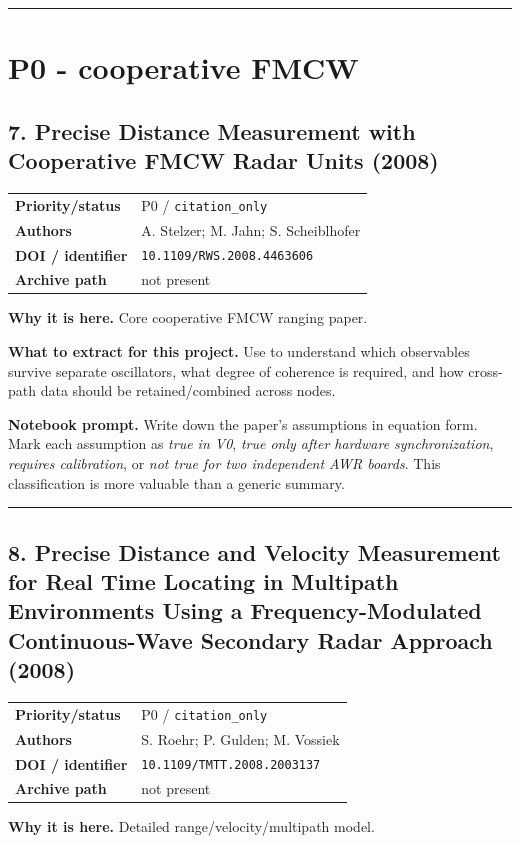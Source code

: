 \documentclass[10.5pt]{article}
\begin{document}
\vspace{0.35em}\hrule\vspace{0.65em}

\clearpage
\section{P0 - cooperative FMCW}

\subsection*{7. Precise Distance Measurement with Cooperative FMCW Radar Units (2008)}
\begin{tabularx}{\textwidth}{@{}p{}X@{}}
\textbf{Priority/status} & P0 / \nolinkurl{citation_only} \\
\textbf{Authors} & A. Stelzer; M. Jahn; S. Scheiblhofer \\
\textbf{DOI / identifier} & \nolinkurl{10.1109/RWS.2008.4463606} \\
\textbf{Archive path} & not present \\
\end{tabularx}
\textbf{Why it is here.} Core cooperative FMCW ranging paper.

\textbf{What to extract for this project.} Use to understand which observables survive separate oscillators, what degree of coherence is required, and how cross-path data should be retained/combined across nodes.

\textbf{Notebook prompt.} Write down the paper's assumptions in equation form. Mark each assumption as \emph{true in V0}, \emph{true only after hardware synchronization}, \emph{requires calibration}, or \emph{not true for two independent AWR boards}. This classification is more valuable than a generic summary.

\vspace{0.35em}\hrule\vspace{0.65em}

\subsection*{8. Precise Distance and Velocity Measurement for Real Time Locating in Multipath Environments Using a Frequency-Modulated Continuous-Wave Secondary Radar Approach (2008)}
\begin{tabularx}{\textwidth}{@{}p{}X@{}}
\textbf{Priority/status} & P0 / \nolinkurl{citation_only} \\
\textbf{Authors} & S. Roehr; P. Gulden; M. Vossiek \\
\textbf{DOI / identifier} & \nolinkurl{10.1109/TMTT.2008.2003137} \\
\textbf{Archive path} & not present \\
\end{tabularx}
\textbf{Why it is here.} Detailed range/velocity/multipath model.
\end{document}
